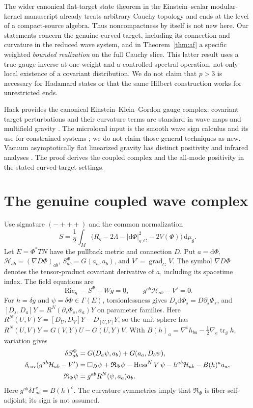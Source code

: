 \documentclass[11pt]{article}
\newcommand{\dd}{\mathrm d}
\newcommand{\Ric}{\operatorname{Ric}}
\newcommand{\tr}{\operatorname{tr}}
\newcommand{\HH}{\mathcal H}
\begin{document}
The wider canonical flat-target state theorem in the Einstein--scalar modular-kernel manuscript \cite[\S\S2--3]{FlatCompanion} already treats arbitrary Cauchy topology and ends at the level of a compact-source algebra. Thus noncompactness by itself is not new here. Our statements concern the genuine curved target, including its connection and curvature in the reduced wave system, and in Theorem~\ref{thm:af} a specific weighted \emph{bounded realization} on the full Cauchy slice. This latter result uses a true gauge inverse at one weight and a controlled spectral operation, not only local existence of a covariant distribution. We do not claim that \(p>3\) is necessary for Hadamard states or that the same Hilbert construction works for unrestricted ends.

Hack \cite{Hack} provides the canonical Einstein--Klein--Gordon gauge complex; covariant target perturbations and their curvature terms are standard in wave maps and multifield gravity \cite{Tao,GongTanaka}. The microlocal input is the smooth wave sign calculus and its use for constrained systems \cite{GOW,Gerard,GW}; we do not claim those general techniques as new. Vacuum asymptotically flat linearized gravity has distinct positivity and infrared analyses \cite{GMW}. The proof derives the coupled complex and the all-mode positivity in the stated curved-target settings.

\section{The genuine coupled wave complex}\label{sec:jacobi}

Use signature \((-+++)\) and the common normalization
\[
 S=\frac12\int_M\bigl(R_g-2\Lambda-|\dd\Phi|_{g,G}^2-2V(\Phi)\bigr)\,\dd\mu_g .
\]
Let \(E=\Phi^*TN\) have the pullback metric and connection \(D\). Put \(a=\dd\Phi\), \(\HH_{ab}=(\nabla D\Phi)_{ab}\), \(S^\Phi_{ab}=G(a_a,a_b)\), and \(V'=\operatorname{grad}_G V\). The symbol \(\nabla D\Phi\) denotes the tensor-product covariant derivative of \(a\), including its spacetime index. The field equations are
\[
  \Ric_g-S^\Phi-Wg=0,\qquad g^{ab}\HH_{ab}-V'=0 .
\]
For \(h=\delta g\) and \(\psi=\delta\Phi\in\Gamma(E)\), torsionlessness gives \(D_s\dd\Phi_s=D\partial_s\Phi_s\), and
\([D_s,D_a]Y=R^N(\partial_s\Phi_s,a_a)Y\) on parameter families. Here \(R^N(U,V)Y=[D_U,D_V]Y-D_{[U,V]}Y\), so the unit sphere has \(R^N(U,V)Y=G(V,Y)U-G(U,Y)V\). With \(B(h)_a=\nabla^b h_{ba}-\tfrac12\nabla_a\tr_g h\), variation gives
\begin{align}
 \delta S^\Phi_{ab}&=G(D_a\psi,a_b)+G(a_a,D_b\psi),\nonumber\\
 \delta_{\rm cov}(g^{ab}\HH_{ab}-V')
  &=\square_D\psi+\mathfrak R_\Phi\psi-\operatorname{Hess}^N V\,\psi
       -h^{ab}\HH_{ab}-B(h)^a a_a,\nonumber\\
 \mathfrak R_\Phi\psi&=g^{ab}R^N(\psi,a_a)a_b .
 \label{eq:variation}
\end{align}
Here \(g^{ab}\delta\Gamma^c_{ab}=B(h)^c\). The curvature symmetries imply that \(\mathfrak R_\Phi\) is fiber self-adjoint; its sign is not assumed.
\end{document}
